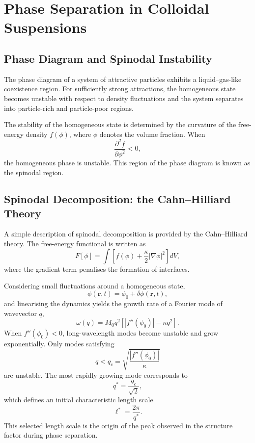 \documentclass[11pt,a4paper]{article}
\begin{document}
\section{Phase Separation in Colloidal Suspensions}

\subsection{Phase Diagram and Spinodal Instability}

The phase diagram of a system of attractive particles exhibits a liquid--gas-like coexistence region. For sufficiently strong attractions, the homogeneous state becomes unstable with respect to density fluctuations and the system separates into particle-rich and particle-poor regions.

The stability of the homogeneous state is determined by the curvature of the free-energy density $f(\phi)$, where $\phi$ denotes the volume fraction. When
\begin{equation}
    \frac{\partial^2 f}{\partial \phi^2} < 0,
\end{equation}
the homogeneous phase is unstable. This region of the phase diagram is known as the spinodal region. 
\subsection{Spinodal Decomposition: the Cahn--Hilliard Theory}

A simple description of spinodal decomposition is provided by the Cahn--Hilliard theory. The free-energy functional is written as
\begin{equation}
    F[\phi]
    =
    \int
    \left[
    f(\phi)
    +
    \frac{\kappa}{2}|\nabla\phi|^2
    \right]dV,
\end{equation}
where the gradient term penalises the formation of interfaces.

Considering small fluctuations around a homogeneous state,
\begin{equation}
    \phi(\mathbf r,t)=\phi_0+\delta\phi(\mathbf r,t),
\end{equation}
and linearising the dynamics yields the growth rate of a Fourier mode of wavevector $q$,
\begin{equation}
    \omega(q)
    =
    M_0 q^2
    \left[
    |f''(\phi_0)|
    -
    \kappa q^2
    \right].
    \label{eq:cahn_growth}
\end{equation}
When $f''(\phi_0)<0$, long-wavelength modes become unstable and grow exponentially. Only modes satisfying
\begin{equation}
    q<q_c = \sqrt{\frac{|f''(\phi_0)|}{\kappa}}
\end{equation}
are unstable. The most rapidly growing mode corresponds to
\begin{equation}
    q^* = \frac{q_c}{\sqrt{2}},
\end{equation}
which defines an initial characteristic length scale
\begin{equation}
    \ell^* = \frac{2\pi}{q^*}.
\end{equation}
This selected length scale is the origin of the peak observed in the structure factor during phase separation.
\end{document}

